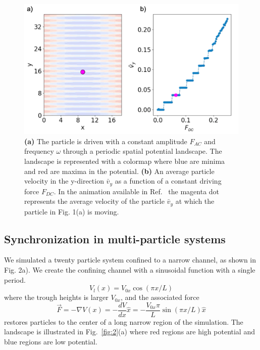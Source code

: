 \documentclass[prb,preprint]{revtex4}
\begin{document}
\begin{center}
\begin{figure}[h!]
\centering
\includegraphics[scale=.25]{single}
\caption{\textbf{(a)} The particle is driven with a constant amplitude $F_{AC}$ and frequency $\omega$ through a periodic spatial potential landscape.  The landscape is represented with a colormap where blue are minima and red are maxima in the potential. \textbf{(b)} An average particle velocity in the y-direction $\bar{v}_{y}$ as a function of a constant driving force $F_{DC}$. In the animation available in Ref.~\cite{supp1} the magenta dot represents the average velocity of the particle $\bar{v}_{y}$ at which the particle in Fig. 1(a) is moving.}
\label{fig:1}
\end{figure}
\end{center}

\subsection{Synchronization in multi-particle systems}
\label{sec:sync}

We simulated a twenty particle system confined to a narrow channel, as shown in Fig. 2a).  We create the confining channel with a sinusoidal function
with a single period.
\begin{equation}
  \label{eq:channel}
  V_l(x) = V_{0x} \cos{(\pi x/L)}
\end{equation}
where the trough heights is larger  $V_{0x}$,
and the associated force
\begin{equation}
\vec{F}=-\nabla V(x) = -\frac{dV}{dx} \hat{x} = - \frac{V_{0x} \pi}{L} \sin{(\pi x/L)} \hat{x}
\end{equation}
restores particles to the center of a long narrow region of the simulation.
The landscape is illustrated in Fig.~\ref{fig:2}(a)
where red regions are high potential
and blue regions are low potential.
\end{document}
